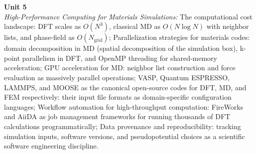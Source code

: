 \noindent\textbf{Unit 5} \\
\textit{High-Performance Computing for Materials Simulations:} The computational cost landscape: DFT scales as $O(N^3)$, classical MD as $O(N \log N)$ with neighbor lists, and phase-field as $O(N_{\text{grid}})$; Parallelization strategies for materials codes: domain decomposition in MD (spatial decomposition of the simulation box), k-point parallelism in DFT, and OpenMP threading for shared-memory acceleration; GPU acceleration for MD: neighbor list construction and force evaluation as massively parallel operations; VASP, Quantum ESPRESSO, LAMMPS, and MOOSE as the canonical open-source codes for DFT, MD, and FEM respectively: their input file formats as domain-specific configuration languages; Workflow automation for high-throughput computation: FireWorks and AiiDA as job management frameworks for running thousands of DFT calculations programmatically; Data provenance and reproducibility: tracking simulation inputs, software versions, and pseudopotential choices as a scientific software engineering discipline.

\newpage
{}
